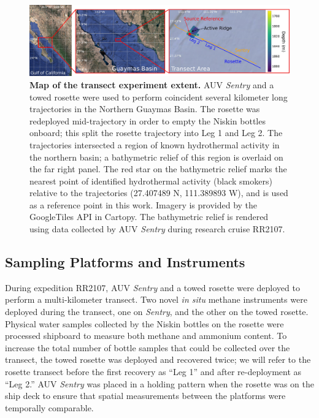 \begin{figure}[h!]
    \begin{center}
    \includegraphics[width=\columnwidth]{figures/chap3_transect_overview.jpg}
    \end{center}
    \caption[Map of transect experiment extent]{\textbf{Map of the transect experiment extent.} AUV \emph{Sentry} and a towed rosette were used to perform coincident several kilometer long trajectories in the Northern Guaymas Basin. The rosette was redeployed mid-trajectory in order to empty the Niskin bottles onboard; this split the rosette trajectory into Leg 1 and Leg 2. The trajectories intersected a region of known hydrothermal activity in the northern basin; a bathymetric relief of this region is overlaid on the far right panel. The red star on the bathymetric relief marks the nearest point of identified hydrothermal activity (black smokers) relative to the trajectories (27.407489 N, 111.389893 W), and is used as a reference point in this work. Imagery is provided by the GoogleTiles API in Cartopy. The bathymetric relief is rendered using data collected by AUV \emph{Sentry} during research cruise RR2107.}
    \label{fig:bathy}
    \end{figure}


\subsection{Sampling Platforms and Instruments}
During expedition RR2107, AUV \emph{Sentry} and a towed rosette were deployed to perform a multi-kilometer transect. Two novel \emph{in situ} methane instruments were deployed during the transect, one on \emph{Sentry}, and the other on the towed rosette. Physical water samples collected by the Niskin bottles on the rosette were processed shipboard to measure both methane and ammonium content. To increase the total number of bottle samples that could be collected over the transect, the towed rosette was deployed and recovered twice; we will refer to the rosette transect before the first recovery as ``Leg 1'' and after re-deployment as ``Leg 2.'' AUV \emph{Sentry} was placed in a holding pattern when the rosette was on the ship deck to ensure that spatial measurements between the platforms were temporally comparable.

